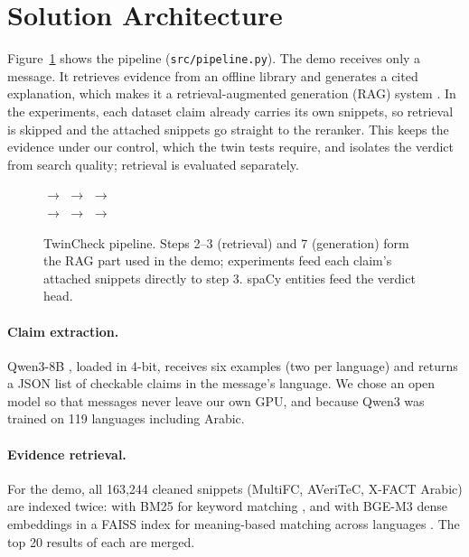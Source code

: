 \section{Solution Architecture}

Figure~\ref{fig:pipeline} shows the pipeline (\texttt{src/pipeline.py}). The demo receives only a message. It retrieves evidence from an offline library and generates a cited explanation, which makes it a retrieval-augmented generation (RAG) system \citep{lewis2020rag}. In the experiments, each dataset claim already carries its own snippets, so retrieval is skipped and the attached snippets go straight to the reranker. This keeps the evidence under our control, which the twin tests require, and isolates the verdict from search quality; retrieval is evaluated separately.

\begin{figure}[t]
\centering
{} $\rightarrow$
 $\rightarrow$
 $\rightarrow$
 \\[6pt]
$\rightarrow$  $\rightarrow$
 $\rightarrow$
\caption{TwinCheck pipeline. Steps 2--3 (retrieval) and 7 (generation) form the RAG part used in the demo; experiments feed each claim's attached snippets directly to step 3. spaCy entities feed the verdict head.}
\label{fig:pipeline}
\end{figure}

\paragraph{Claim extraction.} Qwen3-8B \citep{qwen2025qwen3}, loaded in 4-bit, receives six examples (two per language) and returns a JSON list of checkable claims in the message's language. We chose an open model so that messages never leave our own GPU, and because Qwen3 was trained on 119 languages including Arabic.

\paragraph{Evidence retrieval.} For the demo, all 163,244 cleaned snippets (MultiFC, AVeriTeC, X-FACT Arabic) are indexed twice: with BM25 for keyword matching \citep{robertson2009bm25}, and with BGE-M3 \citep{chen2024bgem3} dense embeddings in a FAISS index for meaning-based matching across languages \citep{johnson2019faiss}. The top 20 results of each are merged.

